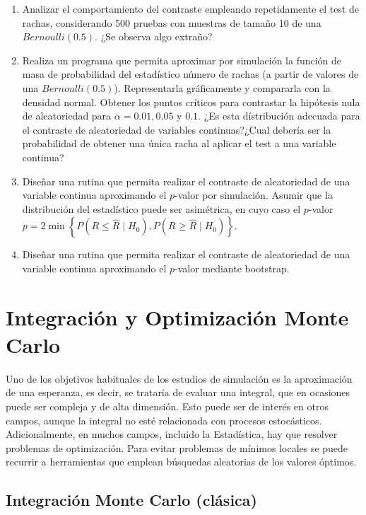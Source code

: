 \documentclass[
]{book}
\theoremstyle{break}
\theoremstyle{definition}
\theoremstyle{definition}
\theoremstyle{definition}
\theoremstyle{remark}
\begin{document}
\begin{enumerate}
\def\labelenumi{\alph{enumi})}
\item
  Analizar el comportamiento del contraste empleando repetidamente
  el test de rachas, considerando 500 pruebas con muestras de
  tamaño 10 de una \(Bernoulli(0.5)\). ¿Se observa algo extraño?
\item
  Realiza un programa que permita aproximar por simulación la
  función de masa de probabilidad del estadístico número de rachas
  (a partir de valores de una \(Bernoulli(0.5)\)). Representarla
  gráficamente y compararla con la densidad normal. Obtener los
  puntos críticos para contrastar la hipótesis nula de
  aleatoriedad para \(\alpha=0.01,0.05\) y \(0.1\). ¿Es esta
  dístribución adecuada para el contraste de aleatoriedad de
  variables continuas?¿Cual debería ser la probabilidad de obtener
  una única racha al aplicar el test a una variable continua?
\item
  Diseñar una rutina que permita realizar el contraste de
  aleatoriedad de una variable continua aproximando el \(p\)-valor
  por simulación. Asumir que la distribución del estadístico puede
  ser asimétrica, en cuyo caso el \(p\)-valor
  \(p=2\min\left\{ P\left( R\leq\hat{R}\mid H_{0}\right) , P\left( R\geq \hat{R}\mid H_{0}\right) \right\}\).
\item
  Diseñar una rutina que permita realizar el contraste de
  aleatoriedad de una variable continua aproximando el \(p\)-valor
  mediante bootstrap.
\end{enumerate}

\hypertarget{cap9}{%
\chapter{Integración y Optimización Monte Carlo}\label{cap9}}

Uno de los objetivos habituales de los estudios de simulación es la aproximación de una esperanza, es decir, se trataría de evaluar una integral, que en ocasiones puede ser compleja y de alta dimensión.
Esto puede ser de interés en otros campos, aunque la integral no esté relacionada con procesos estocásticos.
Adicionalmente, en muchos campos, incluido la Estadística, hay que resolver problemas de optimización.
Para evitar problemas de mínimos locales se puede recurrir a herramientas que emplean búsquedas aleatorias de los valores óptimos.

\hypertarget{integraciuxf3n-monte-carlo-cluxe1sica}{%
\section{Integración Monte Carlo (clásica)}\label{integraciuxf3n-monte-carlo-cluxe1sica}}
\end{document}
